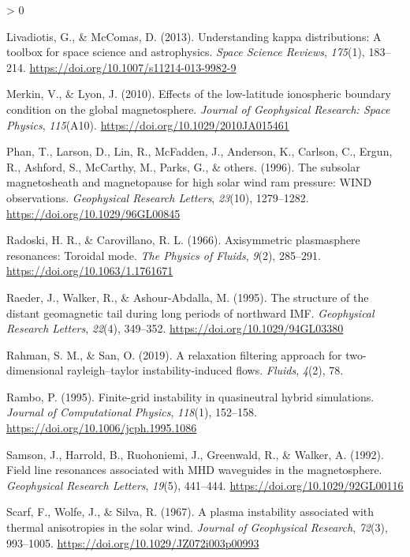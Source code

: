 \documentclass[
  notoc %
]{tufte-book}
\newlength{\cslhangindent}
\newenvironment{CSLReferences}[2] %
 {%
  \setlength{\parindent}{0pt}
  \ifodd #1 \everypar{\setlength{\hangindent}{\cslhangindent}}\ignorespaces\fi
  \ifnum #2 > 0
  \setlength{\parskip}{#2\baselineskip}
  \fi
 }%
 {}
\begin{document}
\begin{CSLReferences}{1}{0}
\leavevmode\hypertarget{ref-livadiotis2013}{}%
Livadiotis, G., \& McComas, D. (2013). Understanding kappa
distributions: A toolbox for space science and astrophysics. \emph{Space
Science Reviews}, \emph{175}(1), 183--214.
\url{https://doi.org/10.1007/s11214-013-9982-9}

\leavevmode\hypertarget{ref-merkin2010}{}%
Merkin, V., \& Lyon, J. (2010). Effects of the low-latitude ionospheric
boundary condition on the global magnetosphere. \emph{Journal of
Geophysical Research: Space Physics}, \emph{115}(A10).
\url{https://doi.org/10.1029/2010JA015461}

\leavevmode\hypertarget{ref-phan1996subsolar}{}%
Phan, T., Larson, D., Lin, R., McFadden, J., Anderson, K., Carlson, C.,
Ergun, R., Ashford, S., McCarthy, M., Parks, G., \& others. (1996). The
subsolar magnetosheath and magnetopause for high solar wind ram
pressure: WIND observations. \emph{Geophysical Research Letters},
\emph{23}(10), 1279--1282. \url{https://doi.org/10.1029/96GL00845}

\leavevmode\hypertarget{ref-radoski1966}{}%
Radoski, H. R., \& Carovillano, R. L. (1966). Axisymmetric plasmasphere
resonances: Toroidal mode. \emph{The Physics of Fluids}, \emph{9}(2),
285--291. \url{https://doi.org/10.1063/1.1761671}

\leavevmode\hypertarget{ref-raeder1995}{}%
Raeder, J., Walker, R., \& Ashour-Abdalla, M. (1995). The structure of
the distant geomagnetic tail during long periods of northward IMF.
\emph{Geophysical Research Letters}, \emph{22}(4), 349--352.
\url{https://doi.org/10.1029/94GL03380}

\leavevmode\hypertarget{ref-rahman2019}{}%
Rahman, S. M., \& San, O. (2019). A relaxation filtering approach for
two-dimensional rayleigh--taylor instability-induced flows.
\emph{Fluids}, \emph{4}(2), 78.

\leavevmode\hypertarget{ref-rambo1995finite}{}%
Rambo, P. (1995). Finite-grid instability in quasineutral hybrid
simulations. \emph{Journal of Computational Physics}, \emph{118}(1),
152--158. \url{https://doi.org/10.1006/jcph.1995.1086}

\leavevmode\hypertarget{ref-samson1992field}{}%
Samson, J., Harrold, B., Ruohoniemi, J., Greenwald, R., \& Walker, A.
(1992). Field line resonances associated with MHD waveguides in the
magnetosphere. \emph{Geophysical Research Letters}, \emph{19}(5),
441--444. \url{https://doi.org/10.1029/92GL00116}

\leavevmode\hypertarget{ref-scarf1967plasma}{}%
Scarf, F., Wolfe, J., \& Silva, R. (1967). A plasma instability
associated with thermal anisotropies in the solar wind. \emph{Journal of
Geophysical Research}, \emph{72}(3), 993--1005.
\url{https://doi.org/10.1029/JZ072i003p00993}


\end{CSLReferences}
\end{document}
